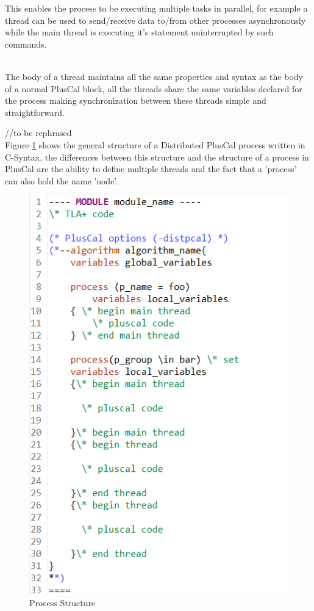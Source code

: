 \documentclass{thesul}
\begin{document}
This enables the process to be executing multiple tasks in parallel, for example a thread can be used to send/receive data to/from other processes asynchronously while the main thread is executing it's statement uninterrupted by such commands.

\hfill\\
The body of a thread maintains all the same properties and syntax as the body of a normal PlusCal block, all the threads share the same variables declared for the process making synchronization between these threads simple and straightforward.


//to be rephrased \hfill\\
Figure \ref{fig:process} shows the general structure of a Distributed PlusCal process written in C-Syntax, the differences between this structure and the structure of a process in PlusCal are the ability to define multiple threads and the fact that a 'process' can also hold the name 'node'.


\begin{figure}[h!]
\centering
\includegraphics[scale=0.8]{ProcessStruct.png}
\caption{Process Structure}
\label{fig:process}
\end{figure}
\FloatBarrier
\end{document}
